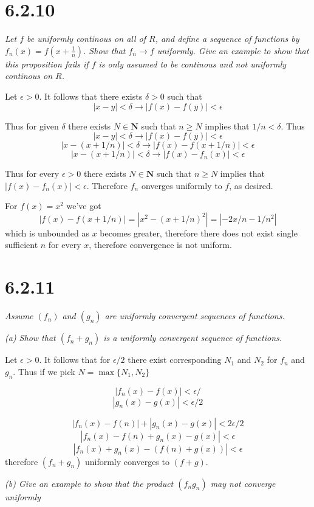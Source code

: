 \documentclass[11pt,oneside,titlepage]{book}
\begin{document}
\section*{6.2.10}
\textit{Let $f$ be uniformly continous on all of $R$, and define a sequence
  of functions by $f_n(x) = f(x + \frac 1 n)$. Show that $f_n \to f$ uniformly.
  Give an example to show that this proposition fails if $f$ is only assumed to
  be continous and not uniformly continous on $R$.}

Let $\epsilon > 0$. It follows that there exists $\delta > 0$ such that
$$|x - y| < \delta \to |f(x) - f(y)| < \epsilon$$

Thus for given $\delta$ there exists $N \in \textbf{N}$ such that
$n \geq N$ implies that $1/n < \delta$. Thus
$$|x - y| < \delta \to |f(x) - f(y)| < \epsilon$$
$$|x - (x + 1/n)| < \delta \to |f(x) - f(x + 1/n)| < \epsilon$$
$$|x - (x + 1/n)| < \delta \to |f(x) - f_n(x)| < \epsilon$$

Thus for every $\epsilon > 0$ there exists $N \in \textbf{N}$ such that
$n \geq N$ implies that $|f(x) - f_n(x)| < \epsilon$. Therefore
$f_n$ onverges uniformly to $f$, as desired.

For $f(x) = x^2$ we've got
$$|f(x) - f(x + 1/n)| = |x^2 - (x + 1/n)^2| = |-2x/n - 1/n^2|$$
which is unbounded as $x$ becomes greater, therefore there does not
exist single sufficient $n$ for every $x$, therefore convergence is
not uniform.

\section*{6.2.11}
\textit{Assume $(f_n)$ and $(g_n)$ are uniformly convergent sequences of
  functions.}

\textit{(a) Show that $(f_n + g_n)$ is a uniformly convergent sequence of
  functions.}

Let $\epsilon > 0$. It follows that for $\epsilon/2$
there exist corresponding $N_1$ and $N_2$ for $f_n$ and $g_n$. Thus
if we pick $N = \max\{N_1, N_2\}$

$$|f_n(x) - f(x)| < \epsilon/$$
$$|g_n(x) - g(x)| < \epsilon/2$$

$$|f_n(x) - f(n)| + |g_n(x) - g(x)| < 2\epsilon/2$$
$$|f_n(x) - f(n) + g_n(x) - g(x)| < \epsilon$$
$$|f_n(x) + g_n(x) - (f(n)  + g(x))| < \epsilon$$
therefore $(f_n + g_n)$ uniformly converges to $(f + g)$.

\textit{(b) Give an example to show that the product $(f_n g_n)$ may not
  converge uniformly}
\end{document}
